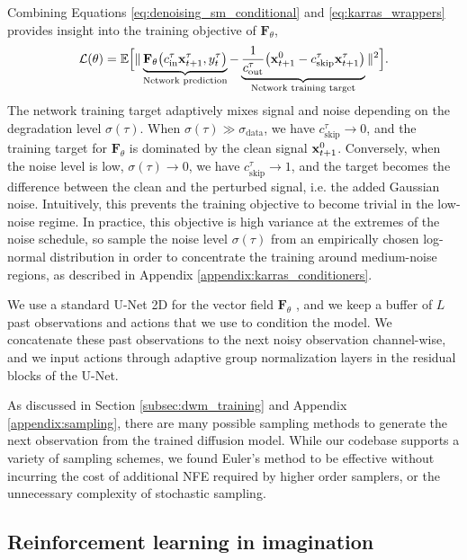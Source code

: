 Combining Equations \ref{eq:denoising_sm_conditional} and \ref{eq:karras_wrappers} provides insight into the training objective of $\mathbf{F}_\theta$,
\begin{align}
\label{eq:effective_obj}
\mathcal{L}(\theta)  = \mathbb{E} \Big[ \Vert 
\underbrace{\mathbf{F}_\theta \big( c_\text{in}^\tau \mathbf{x}_{t+1}^\tau, y_t^\tau \big)}_\text{Network prediction} - 
\underbrace{\frac{1}{c_\text{out}^\tau} \big( \mathbf{x}_{t+1}^0 - c_\text{skip}^\tau \mathbf{x}_{t+1}^\tau\big)}_\text{Network training target}
\Vert^2 \Big].
\end{align}
The network training target adaptively mixes signal and noise depending on the degradation level $\sigma(\tau)$.
When $\sigma(\tau) \gg \sigma_\text{data}$, we have $c_\text{skip}^\tau \to 0$, and the training target for $\mathbf{F}_\theta$ is dominated by the clean signal $\mathbf{x}_{t+1}^0$. Conversely, when the noise level is low, $\sigma(\tau) \to 0$, we have $c_\text{skip}^\tau \to 1$, and the target becomes the difference between the clean and the perturbed signal, i.e. the added Gaussian noise. Intuitively, this prevents the training objective to become trivial in the low-noise regime. In practice, this objective is high variance at the extremes of the noise schedule, so \citet{karras2022elucidating} sample the noise level $\sigma(\tau)$ from an empirically chosen log-normal distribution in order to concentrate the training around medium-noise regions, as described in Appendix \ref{appendix:karras_conditioners}.

We use a standard U-Net 2D for the vector field $\mathbf{F}_\theta$ \citep{ronneberger2015unet}, and we keep a buffer of $L$ past observations and actions that we use to condition the model. We concatenate these past observations to the next noisy observation channel-wise, and we input actions through adaptive group normalization layers \citep{adagn} in the residual blocks \citep{He2015} of the U-Net.

As discussed in Section \ref{subsec:dwm_training} and Appendix \ref{appendix:sampling}, there are many possible sampling methods to generate the next observation from the trained diffusion model. While our codebase supports a variety of sampling schemes, we found Euler's method to be effective without incurring the cost of additional NFE required by higher order samplers, or the unnecessary complexity of stochastic sampling.

\subsection{Reinforcement learning in imagination}
\label{subsec:rl}

